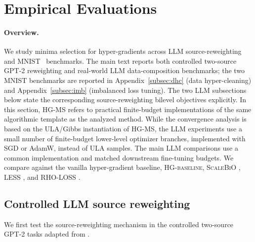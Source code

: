 \documentclass{article}
\theoremstyle{normaltheorem}
\begin{document}
\section{Empirical Evaluations}\label{sec:experiments}
\paragraph{Overview.}
We study minima selection for hyper-gradients across LLM source-reweighting and MNIST~\citep{lecun1998mnist} benchmarks. The main text reports both controlled two-source GPT-2 reweighting and real-world LLM
data-composition benchmarks; the two MNIST benchmarks are reported in Appendix~\ref{subsec:dhc} (data hyper-cleaning)
and Appendix~\ref{subsec:imb} (imbalanced loss tuning). The two LLM subsections below state the corresponding
source-reweighting bilevel objectives explicitly.
In this section, \textsc{HG-MS} refers to practical finite-budget implementations of the same algorithmic template as the analyzed method.
While the convergence analysis is based on the ULA/Gibbs instantiation of \textsc{HG-MS}, the LLM experiments use a small number of finite-budget lower-level optimizer branches, implemented with SGD or AdamW, instead of ULA samples.
The main LLM comparisons use a common implementation and matched downstream fine-tuning budgets. We compare against the vanilla hyper-gradient baseline,  \textsc{HG-baseline}, \textsc{ScaleBiO}
\citep{pan2025scalebio}, \textsc{LESS} \citep{xia2024less}, and \textsc{RHO-LOSS}
\citep{mindermann2022prioritized}.

\subsection{Controlled LLM source reweighting}\label{subsec:llm-controlled-main}
We first test the source-reweighting mechanism in the controlled two-source GPT-2 tasks adapted from
\citet{pan2025scalebio}.
\end{document}
